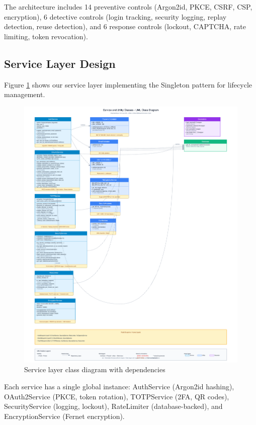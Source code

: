 \documentclass[12pt,a4paper]{article}
\begin{document}
The architecture includes 14 preventive controls (Argon2id, PKCE, CSRF, CSP, encryption), 6 detective controls (login tracking, security logging, replay detection, reuse detection), and 6 response controls (lockout, CAPTCHA, rate limiting, token revocation).

\subsection{Service Layer Design}

Figure \ref{fig:classes} shows our service layer implementing the Singleton pattern for lifecycle management.

\begin{figure}[H]
    \centering
    \includegraphics[width=\textwidth]{diagrams/2_class_diagram_services.png}
    \caption{Service layer class diagram with dependencies}
    \label{fig:classes}
\end{figure}

Each service has a single global instance: AuthService (Argon2id hashing), OAuth2Service (PKCE, token rotation), TOTPService (2FA, QR codes), SecurityService (logging, lockout), RateLimiter (database-backed), and EncryptionService (Fernet encryption).
\end{document}
